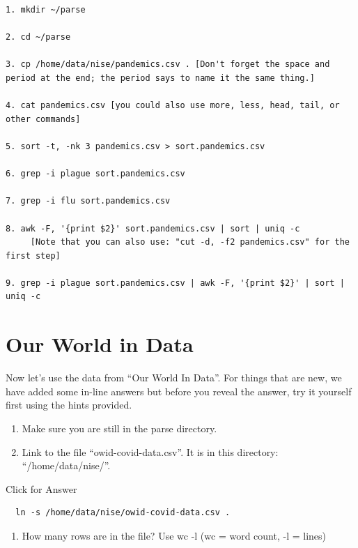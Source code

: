 \documentclass[
]{book}
\providecommand{\tightlist}{%
  \setlength{\itemsep}{0pt}\setlength{\parskip}{0pt}}
\begin{document}
\begin{verbatim}
1. mkdir ~/parse

2. cd ~/parse

3. cp /home/data/nise/pandemics.csv . [Don't forget the space and period at the end; the period says to name it the same thing.]

4. cat pandemics.csv [you could also use more, less, head, tail, or other commands]

5. sort -t, -nk 3 pandemics.csv > sort.pandemics.csv

6. grep -i plague sort.pandemics.csv

7. grep -i flu sort.pandemics.csv

8. awk -F, '{print $2}' sort.pandemics.csv | sort | uniq -c
     [Note that you can also use: "cut -d, -f2 pandemics.csv" for the first step]

9. grep -i plague sort.pandemics.csv | awk -F, '{print $2}' | sort | uniq -c
\end{verbatim}

\hypertarget{our-world-in-data}{%
\section{Our World in Data}\label{our-world-in-data}}

Now let's use the data from ``Our World In Data''. For things that are new, we have added some in-line answers but before you reveal the answer, try it yourself first using the hints provided.

\begin{enumerate}
\def\labelenumi{\arabic{enumi}.}
\setcounter{enumi}{9}
\item
  Make sure you are still in the parse directory.
\item
  Link to the file ``owid-covid-data.csv''. It is in this directory: ``/home/data/nise/''.
\end{enumerate}

Click for Answer

\begin{verbatim}
  ln -s /home/data/nise/owid-covid-data.csv .
\end{verbatim}

\hfill\break

\begin{enumerate}
\def\labelenumi{\arabic{enumi}.}
\setcounter{enumi}{11}
\tightlist
\item
  How many rows are in the file? Use wc -l (wc = word count, -l = lines)
\end{enumerate}
\end{document}
